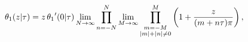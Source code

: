 \[\mathop{\theta_{1}\/}\nolimits\!\left(z\middle|\tau\right)=z\mathop{\theta_{1}%
\/}\nolimits'\!\left(0\middle|\tau\right)\*\lim_{N\to\infty}\prod_{n=-N}^{N}%
\lim_{M\to\infty}\prod_{\begin{subarray}{c}m=-M\\
\left|m\right|+\left|n\right|\neq 0\end{subarray}}^{M}\left(1+\frac{z}{(m+n%
\tau)\pi}\right),\]